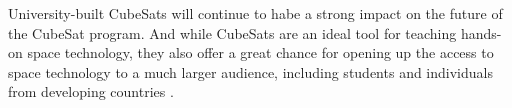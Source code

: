 University-built CubeSats will continue to habe a strong impact on the future of the CubeSat program. And while CubeSats are an ideal tool for teaching hands-on space technology, they also offer a great chance for opening up the access to space technology to a much larger audience, including students and individuals from developing countries \cite{scholz2015toward}. 


